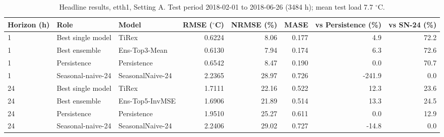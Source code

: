\begin{table}[ht]
\centering
\small
\caption{Headline results, etth1, Setting A. Test period 2018-02-01 to 2018-06-26 (3484 h); mean test load 7.7 $^\circ$C.}
\label{tab:etth1_A_summary}
\begin{tabular}{lllrrrrr}
\toprule
Horizon (h) & Role & Model & RMSE ($^\circ$C) & NRMSE (\%) & MASE & vs Persistence (\%) & vs SN-24 (\%) \\
\midrule
1 & Best single model & TiRex & 0.6224 & 8.06 & 0.177 & 4.9 & 72.2 \\
1 & Best ensemble & Ens-Top3-Mean & 0.6130 & 7.94 & 0.174 & 6.3 & 72.6 \\
1 & Persistence & Persistence & 0.6542 & 8.47 & 0.190 & 0.0 & 70.7 \\
1 & Seasonal-naive-24 & SeasonalNaive-24 & 2.2365 & 28.97 & 0.726 & -241.9 & 0.0 \\
24 & Best single model & TiRex & 1.7111 & 22.16 & 0.522 & 12.3 & 23.6 \\
24 & Best ensemble & Ens-Top5-InvMSE & 1.6906 & 21.89 & 0.514 & 13.3 & 24.5 \\
24 & Persistence & Persistence & 1.9510 & 25.27 & 0.611 & 0.0 & 12.9 \\
24 & Seasonal-naive-24 & SeasonalNaive-24 & 2.2406 & 29.02 & 0.727 & -14.8 & 0.0 \\
\bottomrule
\end{tabular}
\end{table}